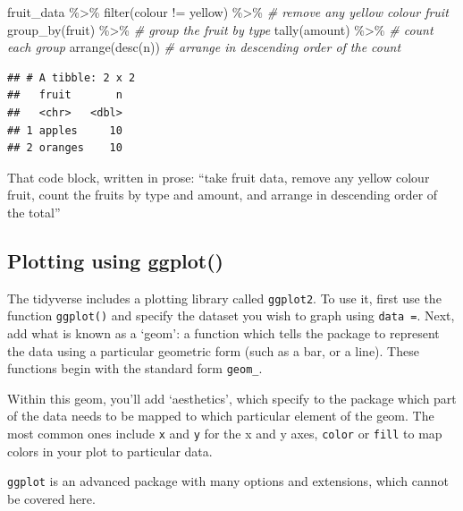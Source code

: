 \documentclass[
]{book}
\newenvironment{Shaded}{\begin{snugshade}}{\end{snugshade}}
\newcommand{\CommentTok}[1]{\textcolor[rgb]{0.56,0.35,0.01}{\textit{#1}}}
\newcommand{\FunctionTok}[1]{\textcolor[rgb]{0.00,0.00,0.00}{#1}}
\newcommand{\NormalTok}[1]{#1}
\newcommand{\SpecialCharTok}[1]{\textcolor[rgb]{0.00,0.00,0.00}{#1}}
\newcommand{\StringTok}[1]{\textcolor[rgb]{0.31,0.60,0.02}{#1}}
\begin{document}
\begin{Shaded}
\begin{Highlighting}[]
\NormalTok{fruit\_data }\SpecialCharTok{\%\textgreater{}\%} 
  \FunctionTok{filter}\NormalTok{(colour }\SpecialCharTok{!=} \StringTok{\textquotesingle{}yellow\textquotesingle{}}\NormalTok{) }\SpecialCharTok{\%\textgreater{}\%} \CommentTok{\# remove any yellow colour fruit}
  \FunctionTok{group\_by}\NormalTok{(fruit) }\SpecialCharTok{\%\textgreater{}\%} \CommentTok{\# group the fruit by type}
  \FunctionTok{tally}\NormalTok{(amount) }\SpecialCharTok{\%\textgreater{}\%} \CommentTok{\# count each group}
  \FunctionTok{arrange}\NormalTok{(}\FunctionTok{desc}\NormalTok{(n)) }\CommentTok{\# arrange in descending order of the count}
\end{Highlighting}
\end{Shaded}

\begin{verbatim}
## # A tibble: 2 x 2
##   fruit       n
##   <chr>   <dbl>
## 1 apples     10
## 2 oranges    10
\end{verbatim}

That code block, written in prose: ``take fruit data, remove any yellow colour fruit, count the fruits by type and amount, and arrange in descending order of the total''

\hypertarget{plotting-using-ggplot}{%
\subsection{Plotting using ggplot()}\label{plotting-using-ggplot}}

The tidyverse includes a plotting library called \texttt{ggplot2}. To use it, first use the function \texttt{ggplot()} and specify the dataset you wish to graph using \texttt{data\ =}. Next, add what is known as a `geom': a function which tells the package to represent the data using a particular geometric form (such as a bar, or a line). These functions begin with the standard form \texttt{geom\_}.

Within this geom, you'll add `aesthetics', which specify to the package which part of the data needs to be mapped to which particular element of the geom. The most common ones include \texttt{x} and \texttt{y} for the x and y axes, \texttt{color} or \texttt{fill} to map colors in your plot to particular data.

\texttt{ggplot} is an advanced package with many options and extensions, which cannot be covered here.
\end{document}
